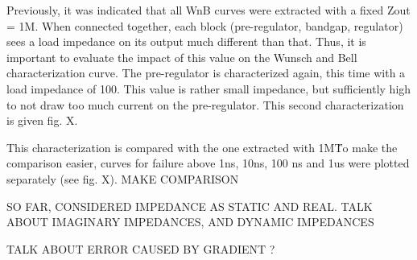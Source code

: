 
Previously, it was indicated that all WnB curves were extracted with a fixed Zout = 1M\textOmega.
When connected together, each block (pre-regulator, bandgap, regulator) sees a load impedance on its output much different than that.
Thus, it is important to evaluate the impact of this value on the Wunsch and Bell characterization curve.
The pre-regulator is characterized again, this time with a load impedance of 100\textOmega.
This value is rather small impedance, but sufficiently high to not draw too much current on the pre-regulator.
This second characterization is given fig. X.


This characterization is compared with the one extracted with 1M\textOmega\.
To make the comparison easier, curves for failure above 1ns, 10ns, 100 ns and 1us were plotted separately (see fig. X).
MAKE COMPARISON


SO FAR, CONSIDERED IMPEDANCE AS STATIC AND REAL.
TALK ABOUT IMAGINARY IMPEDANCES, AND DYNAMIC IMPEDANCES

TALK ABOUT ERROR CAUSED BY GRADIENT ?
